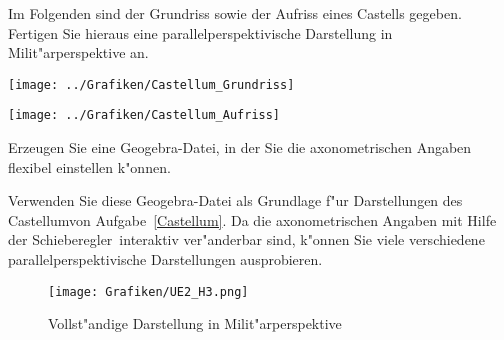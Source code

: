 
\small
\begin{Aufgabe}
Im Folgenden sind der Grundriss sowie der Aufriss eines Castells gegeben. Fertigen Sie hieraus eine parallelperspektivische Darstellung in Milit"arperspektive an.

\texttt{[image: ../Grafiken/Castellum\_Grundriss]}

\texttt{[image: ../Grafiken/Castellum\_Aufriss]}
\end{Aufgabe}
\begin{Aufgabe}
\begin{Teilaufgaben}
\item Erzeugen Sie eine Geogebra-Datei, in der Sie die axonometrischen Angaben flexibel einstellen k"onnen.
\item Verwenden Sie diese Geogebra-Datei als Grundlage f"ur Darstellungen des \glqq Castellum\grqq von Aufgabe~\ref{Castellum}. Da die axonometrischen Angaben mit Hilfe der \glqq Schieberegler\grqq\ interaktiv ver"anderbar sind, k"onnen Sie viele verschiedene parallelperspektivische Darstellungen ausprobieren.
\end{Teilaufgaben}
\end{Aufgabe}
%
\begin{Loesung}
	\begin{figure}[H]
		\centering
		\texttt{[image: Grafiken/UE2\_H3.png]}
		\caption{Vollst"andige Darstellung in Milit"arperspektive}
		\label{fig.H3}
	\end{figure}
\end{Loesung}
%

